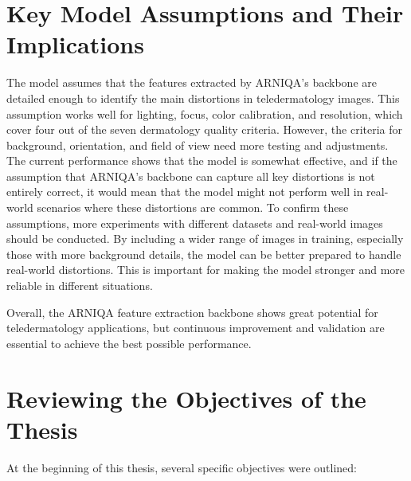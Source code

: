 \section{Key Model Assumptions and Their Implications}
\label{sec:KeyModelAssumptions}
The model assumes that the features extracted by ARNIQA’s backbone are detailed enough to identify the main distortions in teledermatology images. This assumption works well for lighting, focus, color calibration, and resolution, which cover four out of the seven dermatology quality criteria. However, the criteria for background, orientation, and field of view need more testing and adjustments. The current performance shows that the model is somewhat effective, and if the assumption that ARNIQA’s backbone can capture all key distortions is not entirely correct, it would mean that the model might not perform well in real-world scenarios where these distortions are common. To confirm these assumptions, more experiments with different datasets and real-world images should be conducted. By including a wider range of images in training, especially those with more background details, the model can be better prepared to handle real-world distortions. This is important for making the model stronger and more reliable in different situations. \par
\vspace{\baselineskip}
\noindent
Overall, the ARNIQA feature extraction backbone shows great potential for teledermatology applications, but continuous improvement and validation are essential to achieve the best possible performance. \par

\clearpage
\section{Reviewing the Objectives of the Thesis}
\label{sec:ReviewingObjectives}
At the beginning of this thesis, several specific objectives were outlined:

